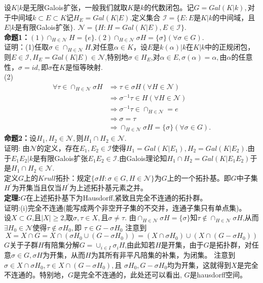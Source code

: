 \documentclass[UTF8]{article}
\begin{document}
设$K|k$是无限Galois扩张，一般我们就取$K$是$k$的代数闭包。记$G=Gal(K|k),$对于中间域$k\subset E\subset K$记$H_{E}=Gal(K|E).$定义集合
$\mathcal{I}=\{E:E$是$K|k$的中间域，且$E|k$是有限Galois扩张$\}$.
$\mathcal{N}=\{H:H=Gal(K|E),E\in \mathcal{I}\}$.\\
\textbf{命题1：}$(1)\cap_{H\in\mathcal{N}}H=\{e\}.(2)\cap_{H\in \mathcal{N}}\sigma H=\{\sigma\}(\forall \sigma \in G)$.\\
证明：(1)任取$\sigma \in \cap_{H\in\mathcal{N}}H$,对任意$\alpha\in K$，设$E$是$k(\alpha)|k$在$K|k$中的正规闭包，则$E\in \mathcal{I},H_{E}=Gal(K|E)\in \mathcal{N}$,特别地$\sigma \in H_{E}$,对$\alpha \in E,\sigma(\alpha)=\alpha,$由$\alpha$的任意性，$\sigma=id,$即$\sigma $在$K$是恒等映射.\\
(2)\[
\begin{split}
\forall \tau\in \cap_{H\in \mathcal{N}}\sigma H&\Rightarrow\tau\in \sigma H(\forall H\in \mathcal{N})\\
&\Rightarrow \sigma^{-1}\tau\in H(\forall H\in \mathcal{N})\\
&\Rightarrow \sigma^{-1}\tau\in \cap_{H\in\mathcal{N}}={e}\\
&\Rightarrow \sigma=\tau\\
&\Rightarrow \cap_{H\in \mathcal{N}}\sigma H=\{\sigma\}(\forall \sigma \in G).
\end{split}
\]
\textbf{命题2：}设$H_{1},H_{2}\in \mathcal{N},$则$H_{1}\cap H_{2}\in \mathcal{N}.$\\
证明: 由$\mathcal{N}$的定义，存在$E_{1},E_{2}\in \mathcal{I}$使得$H_{1}=Gal(K|E_{1}),H_{2}=Gal(K|E_{2}).$由于$E_{1}E_{2}|k$是有限Galois扩张$E_{1}E_{2}\in \mathcal{I}.$由Galois理论知$H_{1}\cap H_{2}=Gal(K|E_{1}E_{2})$于是$H_{1}\cap H_{2}\in \mathcal{N}.$\\
定义$G$上的$Krull$拓扑：规定$\{\sigma H:\sigma \in G,H\in \mathcal{N}\}$为$G$上的一个拓扑基。即$G$中子集$H^{'}$为开集当且仅当$H^{'}$为上述拓扑基元素之并。\\
\textbf{定理:}$G$在上述拓扑基下为Hausdorff,紧致且完全不连通的拓扑群。\\
证明:(i)完全不连通(能写成两个非空开子集的不交并，连通子集只有单点集)。\\
设$X\subset  G$,且$|X|\geq 2$,取$\sigma,\tau\in X,$且$\sigma \neq \tau.$
由$\cap_{H\in \mathcal{N}}\sigma H=\{\sigma\}$知$\tau \notin \cap_{H\in \mathcal{N}}\sigma H$,从而$\exists H_{0}\in \mathcal{N}$使得$\tau \notin \sigma H_{0},$即
$\tau\in G-\sigma H_{0}$
注意到
$$X=X\cap G=X\cap (\sigma H_{0}\cup (G-\sigma H_{0}))=(X\cap \sigma H_{0})\cup (X\cap (G-\sigma H_{0}))$$
$G$关于子群$H$有陪集分解$G=\cup_{i\in I}\sigma_{i}H$,由此知若$H$是开集，由于$G$是拓扑群，对任意$\sigma \in G,$$\sigma H$为开集，从而$H$为其所有非平凡陪集的补集，为闭集。
注意到$\sigma \in X\cap \sigma H_{0} ,\tau \in X\cap (G-\sigma H_{0}),$且
$\sigma H_{0},G-\sigma H_{0}$均为开集，这就得到$X$是完全不连通的。特别地，$G$是完全不连通的，此处还可以看出,
$G$是hausdorff空间。
\end{document}
